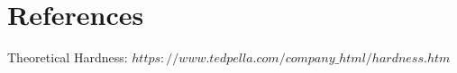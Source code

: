 \documentclass{article}
\begin{document}


\section{References}
Theoretical Hardness:
$https://www.tedpella.com/company\_html/hardness.htm$
\end{document}
